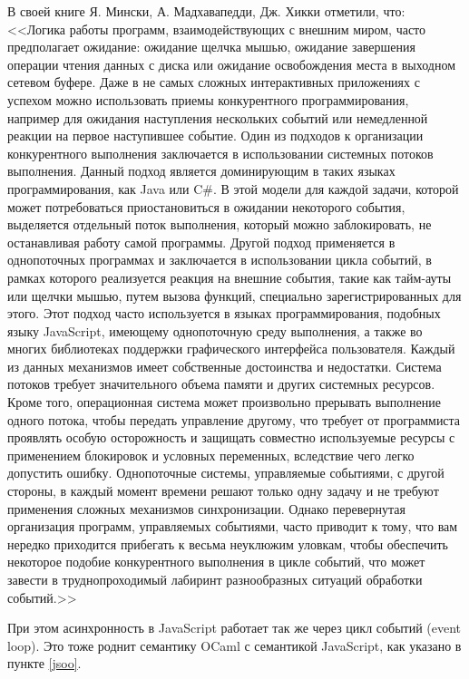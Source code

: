 В своей книге \cite{rwo-ru} Я. Мински, А. Мадхавапедди, Дж. Хикки отметили, что:
<<Логика работы программ, взаимодействующих с внешним миром, часто предполагает
ожидание: ожидание щелчка мышью, ожидание завершения операции чтения
данных с диска или ожидание освобождения места в выходном сетевом буфере.
Даже в не самых сложных интерактивных приложениях с успехом можно использовать
приемы конкурентного программирования, например для ожидания наступления
нескольких событий или немедленной реакции на первое наступившее событие.
Один из подходов к организации конкурентного выполнения заключается
в использовании системных потоков выполнения. Данный подход является
доминирующим в таких языках программирования, как Java или C\#. В этой модели
для каждой задачи, которой может потребоваться приостановиться в ожидании
некоторого события, выделяется отдельный поток выполнения, который можно
заблокировать, не останавливая работу самой программы.
Другой подход применяется в однопоточных программах и заключается в
использовании цикла событий, в рамках которого реализуется реакция на внешние
события, такие как тайм-ауты или щелчки мышью, путем вызова функций,
специально зарегистрированных для этого. Этот подход часто используется в языках
программирования, подобных языку JavaScript, имеющему однопоточную среду
выполнения, а также во многих библиотеках поддержки графического
интерфейса пользователя.
Каждый из данных механизмов имеет собственные достоинства и недостатки.
Система потоков требует значительного объема памяти и других системных
ресурсов. Кроме того, операционная система может произвольно прерывать
выполнение одного потока, чтобы передать управление другому, что требует
от программиста проявлять особую осторожность и защищать совместно используемые
ресурсы с применением блокировок и условных переменных, вследствие чего
легко допустить ошибку.
Однопоточные системы, управляемые событиями, с другой стороны, в каждый
момент времени решают только одну задачу и не требуют применения сложных
механизмов синхронизации. Однако перевернутая организация программ,
управляемых событиями, часто приводит к тому, что вам нередко приходится прибегать
к весьма неуклюжим уловкам, чтобы обеспечить некоторое подобие
конкурентного выполнения в цикле событий, что может завести в труднопроходимый
лабиринт разнообразных ситуаций обработки событий.>>

При этом асинхронность в JavaScript работает так же через цикл событий (event loop).
Это тоже роднит семантику OCaml с семантикой JavaScript, как указано в пункте \ref{jsoo}.


